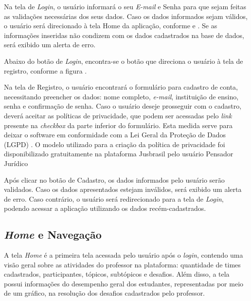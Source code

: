 
Na tela de \textit{Login}, o usuário informará o seu \textit{E-mail} e Senha para que sejam feitas as validações necessárias dos seus dados. Caso os dados informados sejam válidos, o usuário será direcionado à tela Home da aplicação, conforme 
 e . Se as informações inseridas não condizem com os dados cadastrados na base de dados, será exibido um alerta de erro. 

Abaixo do botão de \textit{Login}, encontra-se o botão que direciona o usuário à tela de registro, conforme a figura .


Na tela de Registro, o usuário encontrará o formulário para cadastro de conta, necessitando preencher os dados: nome completo, \textit{e-mail}, instituição de ensino, senha e confirmação de senha. Caso o usuário deseje prosseguir com o cadastro, deverá aceitar as políticas de privacidade, que podem ser acessadas pelo \textit{link} presente na \textit{checkbox} da parte inferior do formulário. Esta medida serve para deixar o software em conformidade com a Lei Geral da Proteção de Dados (LGPD) \cite{lgpd}. O modelo utilizado para a criação da política de privacidade foi disponibilizado gratuitamente na plataforma Jusbrasil pelo usuário Pensador Jurídico \cite{politica-privacidade}

Após clicar no botão de Cadastro, os dados informados pelo usuário serão validados. Caso os dados apresentados estejam inválidos, será exibido um alerta de erro. Caso contrário, o usuário será redirecionado para a tela de \textit{Login}, podendo acessar a aplicação utilizando os dados recém-cadastrados.

\subsection{\textit{Home} e Navegação}

A tela \textit{Home} é a primeira tela acessada pelo usuário após o \textit{login}, contendo uma visão geral sobre as atividades do professor na plataforma: quantidade de times cadastrados, participantes, tópicos, subtópicos e desafios. Além disso, a tela possui informações do desempenho geral dos estudantes, representadas por meio de um gráfico, na resolução dos desafios cadastrados pelo professor.

